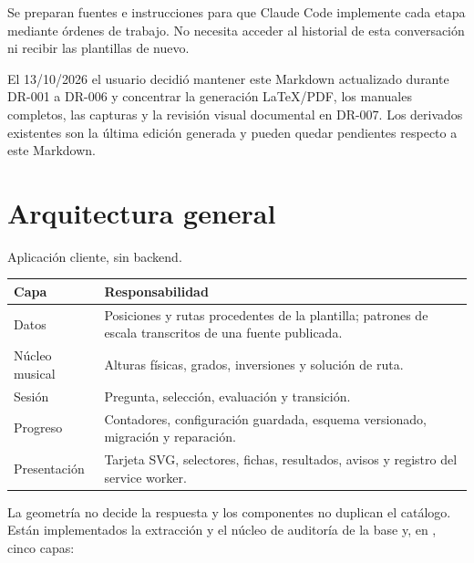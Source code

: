 \documentclass[a4paper,11pt]{article}
\newcounter{none} %
\let\originaltexttt\texttt
\renewcommand{\texttt}[1]{\originaltexttt{\seqsplit{#1}}}
\begin{document}
Se preparan fuentes e instrucciones para que Claude Code implemente cada
etapa mediante órdenes de trabajo. No necesita acceder al historial de
esta conversación ni recibir las plantillas de nuevo.

El 13/10/2026 el usuario decidió mantener este Markdown actualizado
durante DR-001 a DR-006 y concentrar la generación LaTeX/PDF, los
manuales completos, las capturas y la revisión visual documental en
DR-007. Los derivados existentes son la última edición generada y pueden
quedar pendientes respecto a este Markdown.

\Needspace{4cm}
\section{Arquitectura general}\label{arquitectura-general}

Aplicación cliente, sin backend.

{\def\LTcaptype{none} %
\begin{longtable}[]{@{}>{\raggedright\arraybackslash}p{}>{\raggedright\arraybackslash}p{}@{}}
\toprule\noalign{}
Capa & Responsabilidad \\
\midrule\noalign{}
\endhead
\bottomrule\noalign{}
\endlastfoot
Datos & Posiciones y rutas procedentes de la plantilla; patrones de
escala transcritos de una fuente publicada. \\
Núcleo musical & Alturas físicas, grados, inversiones y solución de
ruta. \\
Sesión & Pregunta, selección, evaluación y transición. \\
Progreso & Contadores, configuración guardada, esquema versionado,
migración y reparación. \\
Presentación & Tarjeta SVG, selectores, fichas, resultados, avisos y
registro del service worker. \\
\end{longtable}
}

La geometría no decide la respuesta y los componentes no duplican el
catálogo. Están implementados la extracción y el núcleo de auditoría de
la base y, en \texttt{src/}, cinco capas:
\end{document}
